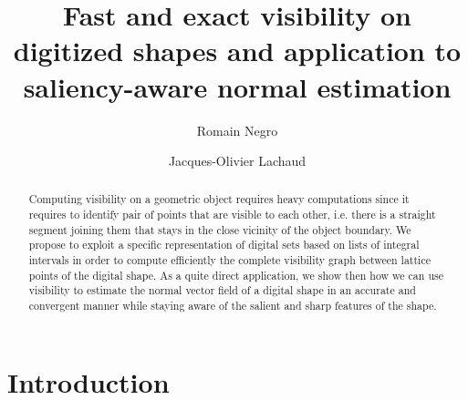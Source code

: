 \documentclass[runningheads]{llncs}
\begin{document}
%
    \title{Fast and exact visibility on digitized shapes and application to saliency-aware normal estimation}
%
%
    \author{Romain Negro \and
    Jacques-Olivier Lachaud}
%
%
%
    \maketitle              %
%
    \begin{abstract}
        Computing visibility on a geometric object requires heavy
        computations since it requires to identify pair of points that
        are visible to each other, i.e. there is a straight segment
        joining them that stays in the close vicinity of the object
        boundary. We propose to exploit a specific representation of
        digital sets based on lists of integral intervals in order to
        compute efficiently the complete visibility graph between
        lattice points of the digital shape. As a quite direct
        application, we show then how we can use visibility to estimate
        the normal vector field of a digital shape in an accurate and
        convergent manner while staying aware of the salient and sharp features of
        the shape.

    \end{abstract}



    \section{Introduction}
\end{document}
